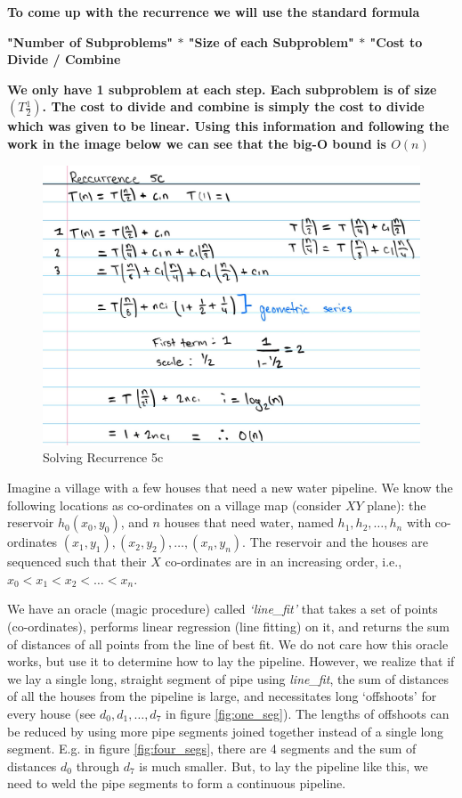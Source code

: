 \documentclass[addpoints]{exam}
\def\mysolution#1{}    %
\begin{document}
\begin{questions}
\begin{parts}
\textbf{To come up with the recurrence we will use the standard formula}

\textbf{"Number of Subproblems" $*$ "Size of each Subproblem" $*$ "Cost to Divide / Combine}

\textbf{We only have 1 subproblem at each step. Each subproblem is of size $(T\frac{1}{2})$. The cost to divide and combine is simply the cost to divide which was given to be linear. Using this information and following the work in the image below we can see that the big-O bound is $O(n)$}

\begin{figure}[H]
  \centering
  \includegraphics[width=0.7\linewidth]{5c.jpg}
  \caption{Solving Recurrence 5c}
\end{figure}

\mysolution{

}

\end{parts}


Imagine a village with a few houses that need a new water pipeline. We know the following locations as co-ordinates on a village map (consider $XY$ plane): the reservoir $h_0 (x_0,y_0)$, and $n$ houses that need water, named $h_1, h_2, \dots, h_n$ with co-ordinates $(x_1, y_1), (x_2, y_2), \dots, (x_n, y_n)$. The reservoir and the houses are sequenced such that their $X$ co-ordinates are in an increasing order, i.e., $x_0 < x_1< x_2 < \dots < x_n$.

We have an oracle (magic procedure) called \textit{`line\_fit'} that takes a set of points (co-ordinates), performs linear regression (line fitting) on it, and returns the sum of distances of all points from the line of best fit. We do not care how this oracle works, but use it to determine how to lay the pipeline. However, we realize that if we lay a single long, straight segment of pipe using \textit{line\_fit}, the sum of distances of all the houses from the pipeline is large, and necessitates long `offshoots' for every house (see $d_0, d_1, \dots, d_7$ in figure \ref{fig:one_seg}). The lengths of offshoots can be reduced by using more pipe segments joined together instead of a single long segment. E.g. in figure \ref{fig:four_segs}, there are 4 segments and the sum of distances $d_0$ through $d_7$ is much smaller. But, to lay the pipeline like this, we need to weld the pipe segments to form a continuous pipeline.


\end{questions}
\end{document}
